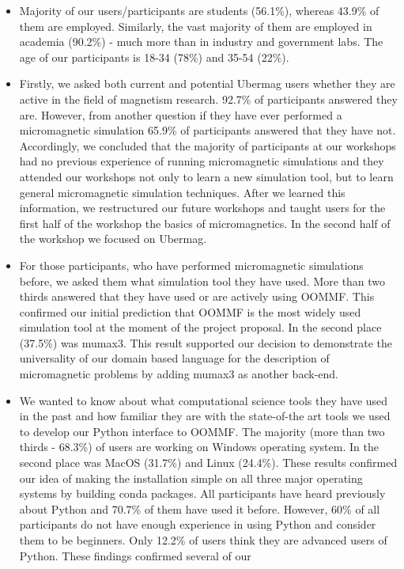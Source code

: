 \documentclass{deliverablereport}
\begin{document}
\begin{itemize}
  \item Majority of our users/participants are students (56.1\%),
whereas 43.9\% of them are employed. Similarly, the vast majority of
them are employed in academia (90.2\%) - much more than in industry
and government labs. The age of our participants is 18-34 (78\%) and
35-54 (22\%).
\item Firstly, we asked both current and potential Ubermag users
whether they are active in the field of magnetism research. 92.7\% of
participants answered they are. However, from another question if they
have ever performed a micromagnetic simulation 65.9\% of participants
answered that they have not. Accordingly, we concluded that the
majority of participants at our workshops had no previous experience
of running micromagnetic simulations and they attended our workshops
not only to learn a new simulation tool, but to learn general
micromagnetic simulation techniques. After we learned this
information, we restructured our future workshops and taught users for
the first half of the workshop the basics of micromagnetics. In the
second half of the workshop we focused on Ubermag.
\item For those participants, who have performed micromagnetic
simulations before, we asked them what simulation tool they have
used. More than two thirds answered that they have used or are
actively using OOMMF. This confirmed our initial prediction that OOMMF
is the most widely used simulation tool at the moment of the project
proposal. In the second place (37.5\%) was mumax3. This result
supported our decision to demonstrate the universality of our domain
based language for the description of micromagnetic problems by adding
mumax3 as another back-end.
\item We wanted to know about what computational science tools they
have used in the past and how familiar they are with the state-of-the
art tools we used to develop our Python interface to OOMMF. The
majority (more than two thirds - 68.3\%) of users are working on
Windows operating system. In the second place was MacOS (31.7\%) and
Linux (24.4\%). These results confirmed our idea of making the
installation simple on all three major operating systems by building
conda packages. All participants have heard previously about Python
and 70.7\% of them have used it before. However, 60\% of all
participants do not have enough experience in using Python and
consider them to be beginners. Only 12.2\% of users think they are
advanced users of Python. These findings confirmed several of our

\end{itemize}
\end{document}
